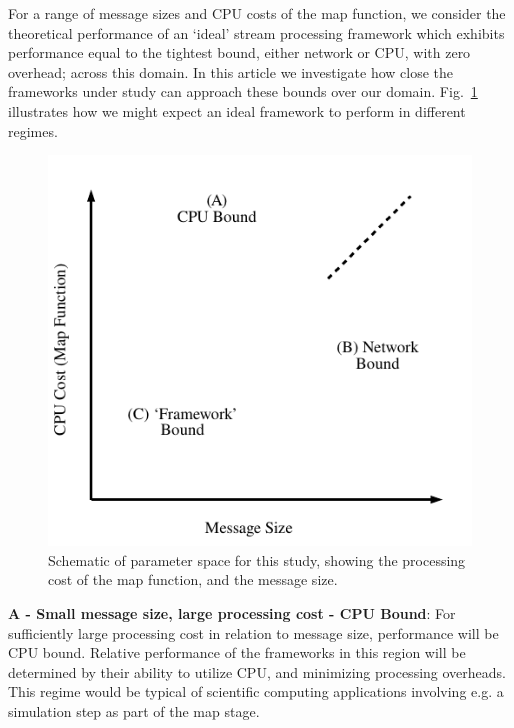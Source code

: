 \documentclass[conference]{IEEEtran}
\begin{document}
For a range of message sizes and CPU costs of the map function,
we consider the theoretical performance of an `ideal' stream processing framework which exhibits performance equal to the tightest bound, either network or CPU, with zero overhead; across this domain. %
In this article we investigate how close the frameworks under study can approach these bounds over our domain.  
Fig.~\ref{fig:prediction} illustrates how we might expect an ideal framework to perform in different regimes.  

\begin{figure}[h]
\begin{center}
\includegraphics[width=0.5\linewidth]{images/prediction}
\end{center}
\caption{Schematic of parameter space for this study, showing the processing cost of the map function, and the message size.}
\label{fig:prediction}
\end{figure}



\textbf{A - Small message size, large processing cost - CPU Bound}: For sufficiently large processing cost in relation to message size, performance will be CPU bound. Relative performance of the frameworks in this region will be determined by their ability to utilize CPU, and minimizing processing overheads. This regime would be typical of scientific computing applications involving e.g. a simulation step as part of the map stage.
\end{document}
